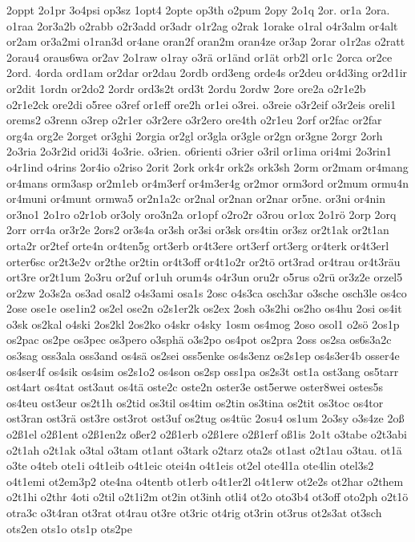 {2oppt
2o1pr
3o4psi
op3sz
1opt4
2opte
op3th
o2pum
2opy
2o1q
2or.
or1a
2ora.
o1raa
2or3a2b
o2rabb
o2r3add
or3adr
o1r2ag
o2rak
1orake
o1ral
o4r3alm
or4alt
or2am
or3a2mi
o1ran3d
or4ane
oran2f
oran2m
oran4ze
or3ap
2orar
o1r2as
o2ratt
2orau4
oraus6wa
or2av
2o1raw
o1ray
o3rä
or1änd
or1ät
orb2l
or1c
2orca
or2ce
2ord.
4orda
ord1am
or2dar
or2dau
2ordb
ord3eng
orde4s
or2deu
or4d3ing
or2d1ir
or2dit
1ordn
or2do2
2ordr
ord3s2t
ord3t
2ordu
2ordw
2ore
ore2a
o2r1e2b
o2r1e2ck
ore2di
o5ree
o3ref
or1eff
ore2h
or1ei
o3rei.
o3reie
o3r2eif
o3r2eis
oreli1
orems2
o3renn
o3rep
o2r1er
o3r2ere
o3r2ero
ore4th
o2r1eu
2orf
or2fac
or2far
org4a
org2e
2orget
or3ghi
2orgia
or2gl
or3gla
or3gle
or2gn
or3gne
2orgr
2orh
2o3ria
2o3r2id
orid3i
4o3rie.
o3rien.
o6rienti
o3rier
o3ril
or1ima
ori4mi
2o3rin1
o4r1ind
o4rins
2or4io
o2riso
2orit
2ork
ork4r
ork2s
ork3sh
2orm
or2mam
or4mang
or4mans
orm3asp
or2m1eb
or4m3erf
or4m3er4g
or2mor
orm3ord
or2mum
ormu4n
or4muni
or4munt
ormwa5
or2n1a2c
or2nal
or2nan
or2nar
or5ne.
or3ni
or4nin
or3no1
2o1ro
o2r1ob
or3oly
oro3n2a
or1opf
o2ro2r
o3rou
or1ox
2o1rö
2orp
2orq
2orr
orr4a
or3r2e
2ors2
or3s4a
or3sh
or3si
or3sk
ors4tin
or3sz
or2t1ak
or2t1an
orta2r
or2tef
orte4n
or4ten5g
ort3erb
or4t3ere
ort3erf
ort3erg
or4terk
or4t3erl
orter6sc
or2t3e2v
or2the
or2tin
or4t3off
or4t1o2r
or2tö
ort3rad
or4trau
or4t3räu
ort3re
or2t1um
2o3ru
or2uf
or1uh
orum4s
o4r3un
oru2r
o5rus
o2rü
or3z2e
orzel5
or2zw
2o3s2a
os3ad
osal2
o4s3ami
osa1s
2osc
o4s3ca
osch3ar
o3sche
osch3le
os4co
2ose
ose1e
ose1in2
os2el
ose2n
o2s1er2k
os2ex
2osh
o3s2hi
os2ho
os4hu
2osi
os4it
o3sk
os2kal
o4ski
2os2kl
2os2ko
o4skr
o4sky
1osm
os4mog
2oso
osol1
o2sö
2os1p
os2pac
os2pe
os3pec
os3pero
o3sphä
o3s2po
os4pot
os2pra
2oss
os2sa
os6s3a2c
os3sag
oss3ala
oss3and
os4sä
os2sei
oss5enke
os4s3enz
os2s1ep
os4s3er4b
osser4e
os4ser4f
os4sik
os4sim
os2s1o2
os4son
os2sp
oss1pa
os2s3t
ost1a
ost3ang
os5tarr
ost4art
os4tat
ost3aut
os4tä
oste2c
oste2n
oster3e
ost5erwe
oster8wei
ostes5s
os4teu
ost3eur
os2t1h
os2tid
os3til
os4tim
os2tin
os3tina
os2tit
os3toc
os4tor
ost3ran
ost3rä
ost3re
ost3rot
ost3uf
os2tug
os4tüc
2osu4
os1um
2o3sy
o3s4ze
2oß
o2ß1el
o2ß1ent
o2ß1en2z
oßer2
o2ß1erb
o2ß1ere
o2ß1erf
oß1is
2o1t
o3tabe
o2t3abi
o2t1ah
o2t1ak
o3tal
o3tam
ot1ant
o3tark
o2tarz
ota2s
ot1ast
o2t1au
o3tau.
ot1ä
o3te
o4teb
ote1i
o4t1eib
o4t1eic
otei4n
o4t1eis
ot2el
ote4l1a
ote4lin
otel3s2
o4t1emi
ot2em3p2
ote4na
o4tentb
ot1erb
o4t1er2l
o4t1erw
ot2e2s
ot2har
o2them
o2t1hi
o2thr
4oti
o2til
o2t1i2m
ot2in
ot3inh
otli4
ot2o
oto3b4
ot3off
oto2ph
o2t1ö
otra3c
o3t4ran
ot3rat
ot4rau
ot3re
ot3ric
ot4rig
ot3rin
ot3rus
ot2s3at
ot3sch
ots2en
ots1o
ots1p
ots2pe
}
